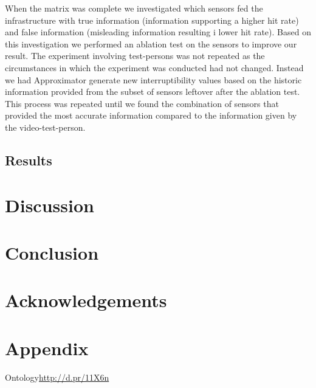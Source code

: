 \documentclass{sigchi}
\begin{document}
When the matrix was complete we investigated which sensors fed the infrastructure with true information (information supporting a higher hit rate) and false information (misleading information resulting i lower hit rate).
Based on this investigation we performed an ablation test on the sensors to improve our result.
The experiment involving test-persons was not repeated as the circumstances in which the experiment was conducted had not changed.
Instead we had Approximator generate new interruptibility values based on the historic information provided from the subset of sensors leftover after the ablation test.
This process was repeated until we found the combination of sensors that provided the most accurate information compared to the information given by the video-test-person.

\subsection{Results}

\section{Discussion}

\section{Conclusion}

\section{Acknowledgements}

\balance



\section{Appendix}
Ontology\url{http://d.pr/11X6n}
\end{document}
